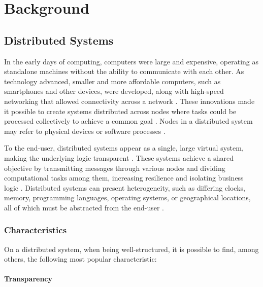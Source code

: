 
\chapter{Background} %

\label{chap:ChapterBackground} %


\section{Distributed Systems}

In the early days of computing, computers were large and expensive, operating as standalone machines without the ability to communicate with each other. As technology advanced, smaller and more affordable computers, such as smartphones and other devices, were developed, along with high-speed networking that allowed connectivity across a network \cite{Tanenbaum2023}. These innovations made it possible to create systems distributed across nodes where tasks could be processed collectively to achieve a common goal \cite{Tanenbaum2023}. Nodes in a distributed system may refer to physical devices or software processes \cite{Vitillo2021}.


To the end-user, distributed systems appear as a single, large virtual system, making the underlying logic transparent \cite{Vitillo2021}. These systems achieve a shared objective by transmitting messages through various nodes and dividing computational tasks among them, increasing resilience and isolating business logic \cite{Sari2015, Vitillo2021}. Distributed systems can present heterogeneity, such as differing clocks, memory, programming languages, operating systems, or geographical locations, all of which must be abstracted from the end-user \cite{Sari2015, Tanenbaum2023}.

\subsection{Characteristics}

On a distributed system, when being well-structured, it is possible to find, among others, the following most popular characteristic:

\subsubsection{Transparency}

